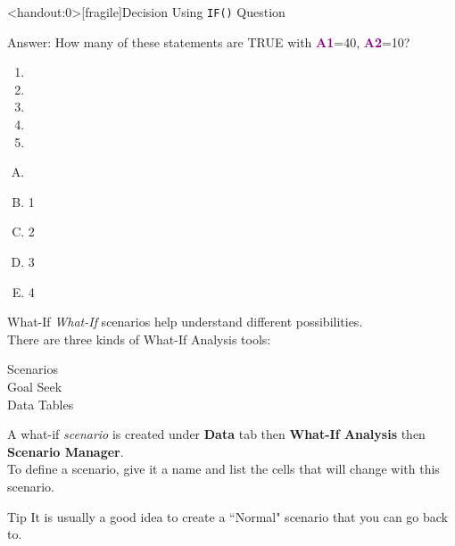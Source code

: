 \documentclass[xcolor=svgnames]{beamer}
\newcommand{\cell}[1]{{\sf \textbf{\textcolor{DarkMagenta}{#1}}}}
\begin{document}
\begin{frame}<handout:0>[fragile]{Decision Using {\tt IF()} Question}
  \begin{block}{Answer:}
How many of these statements are TRUE with \cell{A1}=40, \cell{A2}=10?
 \begin{enumerate}
\item {}
\item {}
\item {}
\item {}
\item {}
 \end{enumerate}
\begin{multicols}{5}
\begin{enumerate}[A)]
\item \textbf<6>{\textit<6>{{}}}
\item 1
\item 2
\item 3
\item 4
\end{enumerate}
\end{multicols}
  \end{block} 
\end{frame}



\begin{frame}{What-If}
\emph{What-If} scenarios help understand different possibilities.\\[1em]
There are three kinds of What-If Analysis tools:
\begin{description}
\item[Scenarios]
\item [Goal Seek]
\item[Data Tables]
\end{description}

A what-if \emph{scenario} is created under {\bf Data} tab then {\bf What-If Analysis} then {\bf Scenario Manager}.\\[1em]
To define a scenario, give it a name and list the cells that will change with this scenario.
\vfill
\begin{alertblock}{Tip}
It is usually a good idea to create a ``Normal" scenario that you can go back to.
\end{alertblock}
\end{frame}
\end{document}
